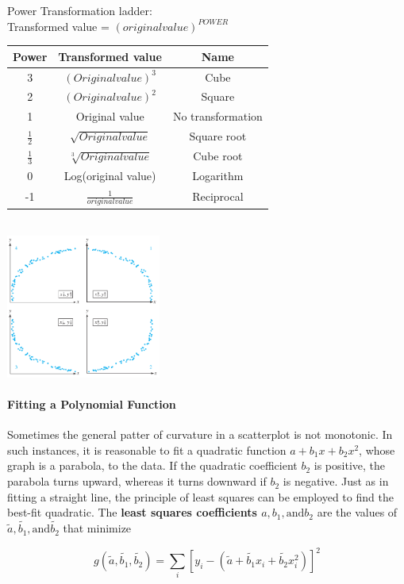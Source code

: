 \documentclass{article}
\newcommand{\p}[1]{\paragraph{#1}} %
\begin{document}
		\begin{center}
			Power Transformation ladder: \\
			Transformed value = $(original value)^{POWER}$
			\begin{tabular}{ c c c } \hline
				Power & Transformed value & Name \\ \hline
				3 & $(Original value)^3$ & Cube \\
				2 & $(Original value)^2$ & Square \\
				1 & Original value & No transformation \\
				$\frac{1}{2}$ & $\sqrt{Original value}$ & Square root \\
				$\frac{1}{3}$ & $\sqrt[3]{Original value}$ & Cube root \\
				0 & Log(original value) & Logarithm \\
				-1 & $\frac{1}{original value}$ & Reciprocal \\
			\end{tabular} \\
			
			\includegraphics[width=2in]{transformation_guide.jpg}
		\end{center}
	
	\p{Fitting a Polynomial Function}
		Sometimes the general patter of curvature in a scatterplot is not monotonic. In such 
		instances, it is reasonable to fit a quadratic function $a + b_1x + b_2x^2$, whose graph is 
		a parabola, to the data. If the quadratic coefficient $b_2$ is positive, the parabola turns 
		upward, whereas it turns downward if $b_2$ is negative. Just as in fitting a straight line, 
		the principle of least squares can be employed to find the best-fit quadratic. The 
		\textbf{least squares coefficients $a, b_1, \text{and} b_2$} are the values of $\tilde{a}, 
		\tilde{b_1}, \text{and} \tilde{b_2}$ that minimize
		
		\[ g(\tilde{a},\tilde{b_1},\tilde{b_2}) = \sum_i [y_i-(\tilde{a}+\tilde{b_1}x_i+\tilde{b_2}
		x_i^2)]^2 \]
		
\end{document}
